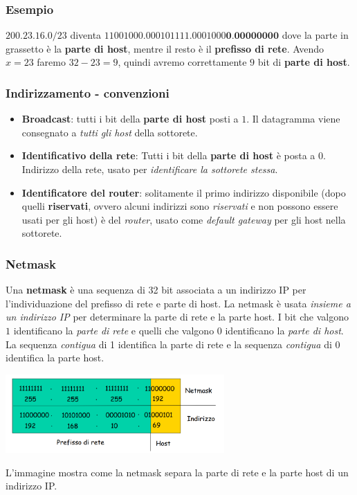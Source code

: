 \subsubsection*{Esempio}
$200.23.16.0/23$ diventa $11001000.000101111.0001000\textbf{0}.\textbf{00000000}$ dove la parte in grassetto è la \textbf{parte di host}, mentre il resto è il \textbf{prefisso di rete}. Avendo $x=23$ faremo $32-23 = 9$, quindi avremo correttamente $9$ bit di \textbf{parte di host}.

\subsubsection{Indirizzamento - convenzioni}
\begin{itemize}
  \item \textbf{Broadcast}: tutti i bit della \textbf{parte di host} posti a $1$. Il datagramma viene consegnato a \textit{tutti gli host} della sottorete.
  \item \textbf{Identificativo della rete}: Tutti i bit della \textbf{parte di host} è posta a $0$. Indirizzo della rete, usato per \textit{identificare la sottorete stessa}.
  \item \textbf{Identificatore del router}: solitamente il primo indirizzo disponibile (dopo quelli \textbf{riservati}, ovvero alcuni indirizzi sono \textit{riservati} e non possono essere usati per gli host) è del \textit{router}, usato come \textit{default gateway} per gli host nella sottorete.
\end{itemize}

\subsubsection{Netmask}
Una \textbf{netmask} è una sequenza di 32 bit associata a un indirizzo IP per l'individuazione del prefisso di rete e parte di host. La netmask è usata \textit{insieme a un indirizzo IP} per determinare la parte di rete e la parte host.
I bit che valgono $1$ identificano la \textit{parte di rete} e quelli che valgono $0$ identificano la \textit{parte di host}. La sequenza \textit{contigua} di 1 identifica la parte di rete e la sequenza \textit{contigua} di 0 identifica la parte host.
\begin{center}
  \includegraphics[width=\textwidth, height=3cm, keepaspectratio]{./img/netmask.png}
\end{center}
L'immagine mostra come la netmask separa la parte di rete e la parte host di un indirizzo IP.

